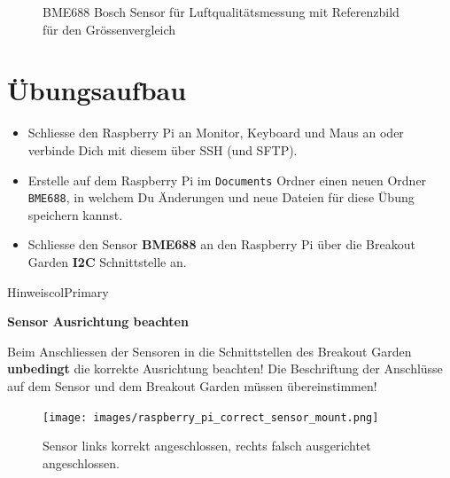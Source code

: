 \documentclass[
  11pt,
  a4paperpaper,
  oneside, openany  ,captions=tableheading
]{scrbook}
\providecommand{\tightlist}{%
  \setlength{\itemsep}{0pt}\setlength{\parskip}{0pt}}
\theoremstyle{definition}
\theoremstyle{remark}
\begin{document}
\begin{figure}


\caption{\label{fig-bme688}BME688 Bosch Sensor für Luftqualitätsmessung
mit Referenzbild für den Grössenvergleich}

\end{figure}%

\section{Übungsaufbau}\label{uxfcbungsaufbau}

\begin{itemize}
\tightlist
\item
  Schliesse den Raspberry Pi an Monitor, Keyboard und Maus an oder
  verbinde Dich mit diesem über SSH (und SFTP).
\item
  Erstelle auf dem Raspberry Pi im \texttt{Documents} Ordner einen neuen
  Ordner \texttt{BME688}, in welchem Du Änderungen und neue Dateien für
  diese Übung speichern kannst.
\item
  Schliesse den Sensor \textbf{BME688} an den Raspberry Pi über die
  Breakout Garden \textbf{I2C} Schnittstelle an.
\end{itemize}

\begin{boxtitle}{Hinweis}{colPrimary}

\textbf{Sensor Ausrichtung beachten}

Beim Anschliessen der Sensoren in die Schnittstellen des Breakout Garden
\textbf{unbedingt} die korrekte Ausrichtung beachten! Die Beschriftung
der Anschlüsse auf dem Sensor und dem Breakout Garden müssen
übereinstimmen!

\begin{figure}[H]

{\centering \texttt{[image: images/raspberry\_pi\_correct\_sensor\_mount.png]}

}

\caption{Sensor links korrekt angeschlossen, rechts falsch ausgerichtet
angeschlossen.}

\end{figure}%

\end{boxtitle}
\end{document}

